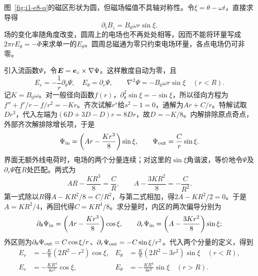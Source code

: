 \begin{solution}
图~\ref{fig:i1-e8-q}的磁区形状为圆，但磁场幅值不具轴对称性。令$\xi=\theta-\omega t$，直接求导得
\[\partial_tB_z=B_0\omega r\sin\xi.
\]
场的变化率随角度改变，圆周上的电场也不再处处相等，因而不能将环量写成$2\pi rE_\theta=-\dot\Phi$来求单一的$E_\theta$。圆周总磁通为零只约束电场环量，各点电场仍可非零。

引入流函数$\Psi$，令$\bm{E}=\bm{e}_z\times\nabla\Psi$。这样散度自动为零，且
\[E_r=-\frac1r\partial_\theta\Psi,\quad E_\theta=\partial_r\Psi,
\qquad \nabla^2\Psi=-B_0\omega r\sin\xi\quad(r<R).
\]
记$K=B_0\omega$。对一般径向函数$f(r)$，$\partial_\theta^2\sin\xi=-\sin\xi$，所以径向方程为$f''+f'/r-f/r^2=-Kr$。齐次试解$r^s$给$s^2-1=0$，通解为$Ar+C/r$。特解试取$Dr^3$，代入左端为$(6D+3D-D)r=8Dr$，故$D=-K/8$。内解排除原点奇点，外部齐次解排除增长项，于是
\[\Psi_{\rm in}=\left(Ar-\frac{Kr^3}{8}\right)\sin\xi,
\qquad \Psi_{\rm out}=\frac Cr\sin\xi.
\]
界面无额外线电荷时，电场的两个分量连续；对这里的$\sin\xi$角谐波，等价地令$\Psi$及$\partial_r\Psi$在$R$处匹配。两式为
\[AR-\frac{KR^3}{8}=\frac CR,\qquad
A-\frac{3KR^2}{8}=-\frac C{R^2}.
\]
第一式除以$R$得$A-KR^2/8=C/R^2$，与第二式相加，得$2A-KR^2/2=0$。于是$A=KR^2/4$，再回代得$C=KR^4/8$。求分量时，内区的两次偏导分别为
\[\partial_\theta\Psi_{\rm in}=\left(Ar-\frac{Kr^3}{8}\right)\cos\xi,
\qquad \partial_r\Psi_{\rm in}=\left(A-\frac{3Kr^2}{8}\right)\sin\xi;\]
外区则为$\partial_\theta\Psi_{\rm out}=C\cos\xi/r$、$\partial_r\Psi_{\rm out}=-C\sin\xi/r^2$。代入两个分量的定义，得到
\[\boxed{\begin{aligned}
E_r&=-\frac K8(2R^2-r^2)\cos\xi,&
E_\theta&=\frac K8(2R^2-3r^2)\sin\xi\quad(r<R),\\
E_r&=-\frac{KR^4}{8r^2}\cos\xi,&
E_\theta&=-\frac{KR^4}{8r^2}\sin\xi\quad(r>R).
\end{aligned}}
\]


\end{solution}
